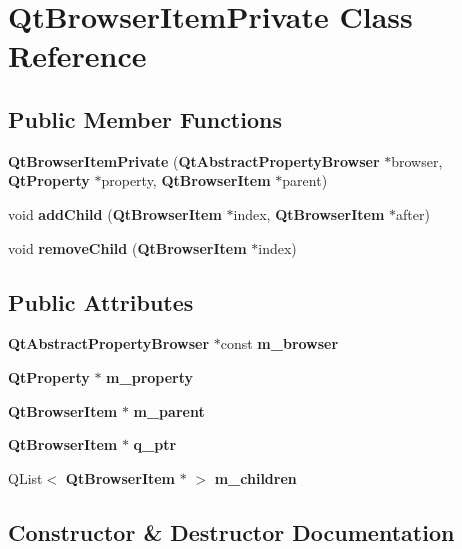 \section{Qt\+Browser\+Item\+Private Class Reference}
\label{classQtBrowserItemPrivate}
\subsection*{Public Member Functions}
\begin{DoxyCompactItemize}
\item 
{\bf Qt\+Browser\+Item\+Private} ({\bf Qt\+Abstract\+Property\+Browser} $\ast$browser, {\bf Qt\+Property} $\ast$property, {\bf Qt\+Browser\+Item} $\ast$parent)
\item 
void {\bf add\+Child} ({\bf Qt\+Browser\+Item} $\ast$index, {\bf Qt\+Browser\+Item} $\ast$after)
\item 
void {\bf remove\+Child} ({\bf Qt\+Browser\+Item} $\ast$index)
\end{DoxyCompactItemize}
\subsection*{Public Attributes}
\begin{DoxyCompactItemize}
\item 
{\bf Qt\+Abstract\+Property\+Browser} $\ast$const {\bf m\+\_\+browser}
\item 
{\bf Qt\+Property} $\ast$ {\bf m\+\_\+property}
\item 
{\bf Qt\+Browser\+Item} $\ast$ {\bf m\+\_\+parent}
\item 
{\bf Qt\+Browser\+Item} $\ast$ {\bf q\+\_\+ptr}
\item 
Q\+List$<$ {\bf Qt\+Browser\+Item} $\ast$ $>$ {\bf m\+\_\+children}
\end{DoxyCompactItemize}


\subsection{Constructor \& Destructor Documentation}

